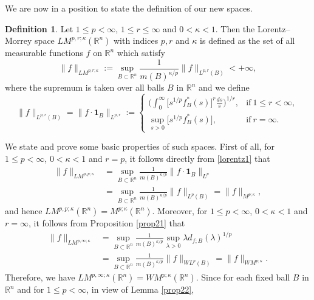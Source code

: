 \documentclass{birkjour}
\theoremstyle{definition}
\newtheorem{defn}[thm]{Definition}
\theoremstyle{remark}
\numberwithin{equation}{section}
\begin{document}
We are now in a position to state the definition of our new spaces.
\begin{defn}
Let $1\leq p<\infty$, $1\leq r\leq\infty$ and $0<\kappa<1$. Then the Lorentz--Morrey space $LM^{p,r;\kappa}(\mathbb R^n)$ with indices $p,r$ and $\kappa$ is defined as the set of all measurable functions $f$ on $\mathbb R^n$ which satisfy
\begin{equation*}
\|f\|_{LM^{p,r;\kappa}}:=\sup_{B\subset\mathbb R^n}\frac{1}{m(B)^{\kappa/p}}\|f\|_{L^{p,r}(B)}<+\infty,
\end{equation*}
where the supremum is taken over all balls $B$ in $\mathbb R^n$ and we define
\begin{equation*}
\|f\|_{L^{p,r}(B)}=\|f\cdot \mathbf{1}_{B}\|_{L^{p,r}}:=
\begin{cases}
\displaystyle\bigg(\int_0^{\infty}\Big[s^{1/p}f^{*}_{B}(s)\Big]^r\frac{ds}{s}\bigg)^{1/r}, &\mbox{if}~ 1\leq r<\infty,\\
\displaystyle\sup_{s>0}\Big[s^{1/p}f^{*}_{B}(s)\Big], &\mbox{if}~ r=\infty.
\end{cases}
\end{equation*}
\end{defn}
We state and prove some basic properties of such spaces. First of all, for $1\leq p<\infty$, $0<\kappa<1$ and $r=p$, it follows directly from \eqref{lorentz1} that
\begin{equation*}
\begin{split}
\|f\|_{LM^{p,p;\kappa}}&=\sup_{B\subset\mathbb R^n}\frac{1}{m(B)^{\kappa/p}}\|f\cdot \mathbf{1}_{B}\|_{L^{p}}\\
&=\sup_{B\subset\mathbb R^n}\frac{1}{m(B)^{\kappa/p}}\|f\|_{L^{p}(B)}=\|f\|_{M^{p;\kappa}},
\end{split}
\end{equation*}
and hence $LM^{p,p;\kappa}(\mathbb R^n)=M^{p;\kappa}(\mathbb R^n)$. Moreover, for $1\leq p<\infty$, $0<\kappa<1$ and $r=\infty$, it follows from Proposition \ref{prop21} that
\begin{equation*}
\begin{split}
\|f\|_{LM^{p,\infty;\kappa}}&=\sup_{B\subset\mathbb R^n}\frac{1}{m(B)^{\kappa/p}}\sup_{\lambda>0}\lambda d_{f;B}(\lambda)^{1/p}\\
&=\sup_{B\subset\mathbb R^n}\frac{1}{m(B)^{\kappa/p}}\|f\|_{WL^{p}(B)}=\|f\|_{WM^{p;\kappa}}.
\end{split}
\end{equation*}
Therefore, we have $LM^{p,\infty;\kappa}(\mathbb R^n)=WM^{p;\kappa}(\mathbb R^n)$. Since for each fixed ball $B$ in $\mathbb R^n$ and for $1\leq p<\infty$, in view of Lemma \ref{prop22},
\end{document}
